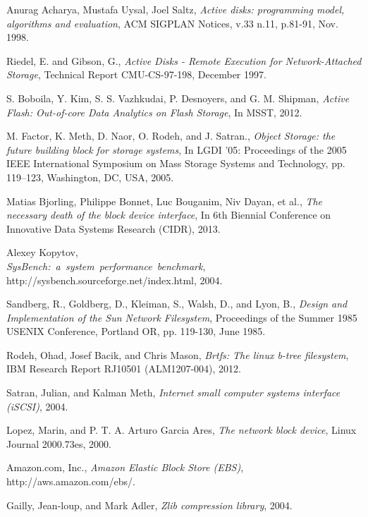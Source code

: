 \documentclass[10pt,twocolumn]{article}
\begin{document}
\begin{thebibliography}{9}

  Anurag Acharya, Mustafa Uysal, Joel Saltz,
  \emph{Active disks: programming model, algorithms and evaluation},
  ACM SIGPLAN Notices,
  v.33 n.11,
  p.81-91,
  Nov. 1998.

  Riedel, E. and Gibson, G.,
  \emph{Active Disks - Remote Execution for Network-Attached Storage},
  Technical Report CMU-CS-97-198,
  December 1997.

  S. Boboila, Y. Kim, S. S. Vazhkudai, P. Desnoyers, and G. M. Shipman,
  \emph{Active Flash: Out-of-core Data Analytics on Flash Storage},
  In MSST,
  2012.

  M. Factor, K. Meth, D. Naor, O. Rodeh, and J. Satran.,
  \emph{Object Storage: the future building block for storage systems},
  In LGDI ’05: Proceedings of the 2005 IEEE International Symposium on Mass Storage Systems and Technology,
  pp. 119–123, 
  Washington, DC, USA,
  2005. 

  Matias Bjorling, Philippe Bonnet, Luc Bouganim, Niv Dayan, et al.,
  \emph{The necessary death of the block device interface},
  In 6th Biennial Conference on Innovative Data Systems Research (CIDR),
  2013.

  Alexey Kopytov,\\
  \mbox{\emph{SysBench: a system performance benchmark}},
  http://sysbench.sourceforge.net/index.html,
  2004.

  Sandberg, R., Goldberg, D., Kleiman, S., Walsh, D., and Lyon, B.,
  \emph{Design and Implementation of the Sun Network Filesystem},
  Proceedings of the Summer 1985 USENIX Conference,
  Portland OR,
  pp. 119-130,
  June 1985.

  Rodeh, Ohad, Josef Bacik, and Chris Mason,
  \emph{Brtfs: The linux b-tree filesystem},
  IBM Research Report RJ10501 (ALM1207-004),
  2012.

  Satran, Julian, and Kalman Meth,
  \emph{Internet small computer systems interface (iSCSI)},
  2004.

  Lopez, Marin, and P. T. A. Arturo Garcia Ares,
  \emph{The network block device},
  Linux Journal 2000.73es,
  2000.

  Amazon.com, Inc.,
  \emph{Amazon Elastic Block Store (EBS)},
  http://aws.amazon.com/ebs/.

  Gailly, Jean-loup, and Mark Adler,
  \emph{Zlib compression library},
  2004.

\end{thebibliography}
\end{document}
